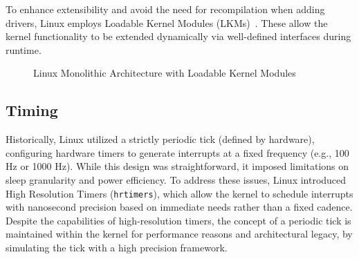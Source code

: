 \documentclass[a4paper,10pt,twoside]{report}
\theoremstyle{definition}
\begin{document}
To enhance extensibility and avoid the need for recompilation when adding drivers, Linux employs Loadable Kernel Modules (LKMs)~\cite{linux_lkm}. These allow the kernel functionality to be extended dynamically via well-defined interfaces during runtime.

\begin{figure}[htbp]
    \centering
    \caption{Linux Monolithic Architecture with Loadable Kernel Modules}
    \label{fig:linux_lkm}
\end{figure}

\subsection{Timing}
\label{subsec:linux-timing}

Historically, Linux utilized a strictly periodic tick (defined by hardware), configuring hardware timers to generate interrupts at a fixed frequency (e.g., 100 Hz or 1000 Hz). While this design was straightforward, it imposed limitations on sleep granularity and power efficiency. To address these issues, Linux introduced High Resolution Timers (\texttt{hrtimers}), which allow the kernel to schedule interrupts with nanosecond precision based on immediate needs rather than a fixed cadence. Despite the capabilities of high-resolution timers, the concept of a periodic tick is maintained within the kernel for performance reasons and architectural legacy, by simulating the tick with a high precision framework.
\end{document}
